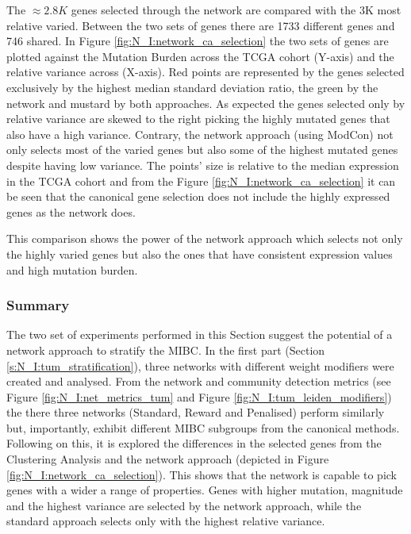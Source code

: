 The $\approx2.8K$ genes selected through the network are compared with the 3K most relative varied. Between the two sets of genes there are 1733 different genes and 746 shared. In Figure \ref{fig:N_I:network_ca_selection} the two sets of genes are plotted against the Mutation Burden across the TCGA cohort (Y-axis) and the relative variance across (X-axis). Red points are represented by the genes selected exclusively by the highest median standard deviation ratio, the green by the network and mustard by both approaches. As expected the genes selected only by relative variance are skewed to the right picking the highly mutated genes that also have a high variance. Contrary, the network approach (using ModCon) not only selects most of the varied genes but also some of the highest mutated genes despite having low variance. The points' size is relative to the median expression in the TCGA cohort and from the Figure \ref{fig:N_I:network_ca_selection} it can be seen that the canonical gene selection does not include the highly expressed genes as the network does.

This comparison shows the power of the network approach which selects not only the highly varied genes but also the ones that have consistent expression values and high mutation burden.

\subsubsection{Summary}

The two set of experiments performed in this Section suggest the potential of a network approach to stratify the MIBC. In the first part (Section \ref{s:N_I:tum_stratification}), three networks with different weight modifiers were created and analysed. From the network and community detection metrics (see Figure \ref{fig:N_I:net_metrics_tum} and Figure \ref{fig:N_I:tum_leiden_modifiers}) the there three networks (Standard, Reward and Penalised) perform similarly but, importantly, exhibit different MIBC subgroups from the canonical methods. Following on this, it is explored the differences in the selected genes from the Clustering Analysis and the network approach (depicted in Figure \ref{fig:N_I:network_ca_selection}). This shows that the network is capable to pick genes with a wider a range of properties. Genes with higher mutation, magnitude and the highest variance are selected by the network approach, while the standard approach selects only with the highest relative variance.

